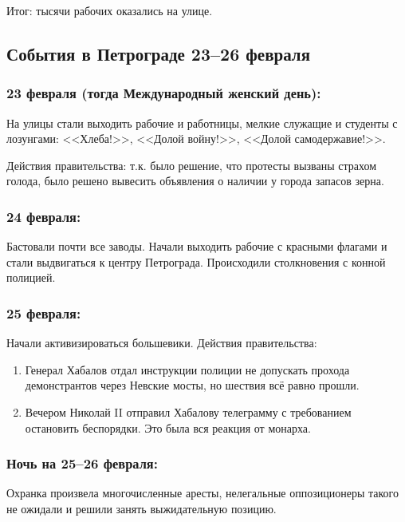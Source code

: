Итог: тысячи рабочих оказались на улице.

\subsection{События в Петрограде 23--26 февраля}

\subsubsection{\textbf{23 февраля (тогда Международный женский день):}}

На улицы стали выходить рабочие и работницы, мелкие служащие и студенты с лозунгами: <<Хлеба!>>, <<Долой войну!>>, <<Долой самодержавие!>>.

Действия правительства: т.к. было решение, что протесты вызваны страхом голода, было решено вывесить объявления о наличии у города запасов зерна.

\subsubsection{\textbf{24 февраля:}}

Бастовали почти все заводы. Начали выходить рабочие с красными флагами и стали выдвигаться к центру Петрограда. Происходили столкновения с конной полицией.

\subsubsection{\textbf{25 февраля:}}

Начали активизироваться большевики.
Действия правительства:

\begin{enumerate}
    \item Генерал Хабалов отдал инструкции полиции не допускать прохода демонстрантов через Невские мосты, но шествия всё равно прошли.
    \item Вечером Николай II отправил Хабалову телеграмму с требованием остановить беспорядки. Это была вся реакция от монарха.
\end{enumerate}

\subsubsection{\textbf{Ночь на 25--26 февраля:}}

Охранка произвела многочисленные аресты, нелегальные оппозиционеры такого не ожидали и решили занять выжидательную позицию.

